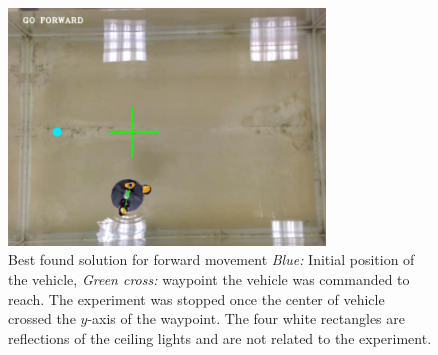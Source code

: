 \begin{figure}
\centering
\includegraphics[width=0.75\textwidth]{Files/Figures/go_fw.png}
\caption[Best found solution for forward movement]{Best found solution for forward movement \textit{Blue:} Initial position of the vehicle, \textit{Green cross:} waypoint the vehicle was commanded to reach. The experiment was stopped once the center of vehicle crossed the $y$-axis of the waypoint. The four white rectangles are reflections of the ceiling lights and are not related to the experiment.}
\label{fig-intrsc-fw}
\end{figure}

